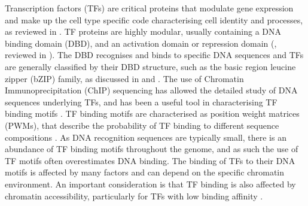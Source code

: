 Transcription factors (TFs) are critical proteins that modulate gene expression and make up the cell type specific code characterising cell identity and processes, as reviewed in \cite{latchman_transcription_1997}. TF proteins are highly modular, usually containing a DNA binding domain (DBD), and an activation domain or repression domain (\cite{kadonaga_distinct_1988, freedman_function_1988, sturm_ubiquitous_1988, ma_new_1987, hope_functional_1986, brent_eukaryotic_1985, lillie_adenovirus_1986, licht_drosophila_1990}, reviewed in \cite{latchman_transcription_1997, mitchell_transcriptional_1989, hanna-rose_active_1996}). The DBD recognises and binds to specific DNA sequences and TFs are generally classified by their DBD structure, such as the basic region leucine zipper (bZIP) family, as discussed in \cite{luscombe_overview_2000} and \cite{weirauch_catalogue_2011}. The use of Chromatin Immunoprecipitation (ChIP) sequencing has allowed the detailed study of DNA sequences underlying TFs, and has been a useful tool in characterising TF binding motifs \citep{mundade_role_2014, machanick_meme-chip_2011, boeva_analysis_2016}. TF binding motifs are characterised as position weight matrices (PWMs), that describe the probability of TF binding to different sequence compositions \citep{stormo_dna_2000}. As DNA recognition sequences are typically small, there is an abundance of TF binding motifs throughout the genome, and as such the use of TF motifs often overestimates DNA binding. The binding of TFs to their DNA motifs is affected by many factors and can depend on the specific chromatin environment. An important consideration is that TF binding is also affected by chromatin accessibility, particularly for TFs with low binding affinity \citep{spitz_transcription_2012}.

